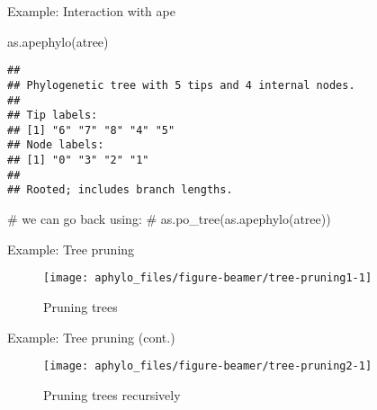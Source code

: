 \documentclass[9pt,handout,ignorenonframetext,]{beamer}
\newenvironment{Shaded}{\begin{snugshade}}{\end{snugshade}}
\newcommand{\KeywordTok}[1]{\textcolor[rgb]{0.94,0.87,0.69}{#1}}
\newcommand{\CommentTok}[1]{\textcolor[rgb]{0.50,0.62,0.50}{#1}}
\newcommand{\NormalTok}[1]{\textcolor[rgb]{0.80,0.80,0.80}{#1}}
\begin{document}
\begin{frame}[fragile,t]{Example: Interaction with ape}

\footnotesize

\begin{Shaded}
\begin{Highlighting}[]
\KeywordTok{as.apephylo}\NormalTok{(atree)}
\end{Highlighting}
\end{Shaded}

\begin{verbatim}
## 
## Phylogenetic tree with 5 tips and 4 internal nodes.
## 
## Tip labels:
## [1] "6" "7" "8" "4" "5"
## Node labels:
## [1] "0" "3" "2" "1"
## 
## Rooted; includes branch lengths.
\end{verbatim}

\begin{Shaded}
\begin{Highlighting}[]
\CommentTok{# we can go back using:}
\CommentTok{# as.po_tree(as.apephylo(atree))}
\end{Highlighting}
\end{Shaded}

\normalsize

\end{frame}

\begin{frame}[t]{Example: Tree pruning}

\footnotesize

\begin{figure}

{\centering \texttt{[image: aphylo\_files/figure-beamer/tree-pruning1-1]} 

}

\caption{Pruning trees}\label{fig:tree-pruning1}
\end{figure}

\normalsize

\end{frame}

\begin{frame}[t]{Example: Tree pruning (cont.)}

\footnotesize

\begin{figure}

{\centering \texttt{[image: aphylo\_files/figure-beamer/tree-pruning2-1]} 

}

\caption{Pruning trees recursively}\label{fig:tree-pruning2}
\end{figure}

\normalsize

\end{frame}
\end{document}
